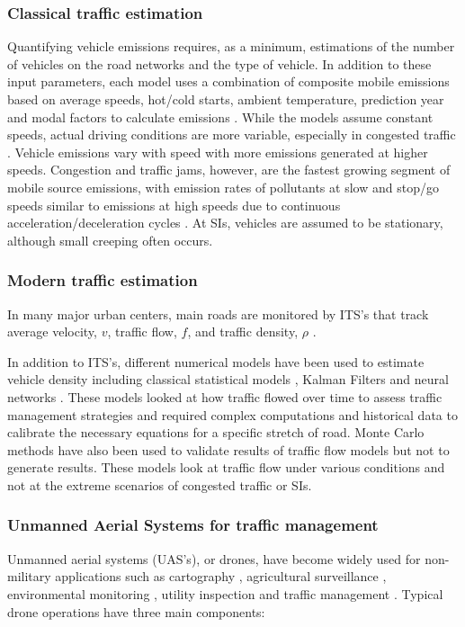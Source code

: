 \subsubsection{Classical traffic estimation} \label{sssec:ClassicalTraffic}

Quantifying vehicle emissions requires, as a minimum, estimations of the number of vehicles on the road networks and the type of vehicle. In addition to these input parameters, each model uses a combination of composite mobile emissions based on average speeds, hot/cold starts, ambient temperature, prediction year and modal factors to calculate emissions \citep{Franco2013}. While the models assume constant speeds, actual driving conditions are more variable, especially in congested traffic \citep{Freeman2015b}. Vehicle emissions vary with speed with more emissions generated at higher speeds. Congestion and traffic jams, however, are the fastest growing segment of mobile source emissions, with emission rates of pollutants at slow and stop/go speeds similar to emissions at high speeds due to continuous acceleration/deceleration cycles \citep{Barth2009}. At SIs, vehicles are assumed to be stationary, although small creeping often occurs.

\subsubsection{Modern traffic estimation}

In many major urban centers, main roads are monitored by ITS's that track average velocity, $v$, traffic flow, $f$, and traffic density, $\rho$ \citep{Wu2007, Abtahi2011, Bartosz2015}.

In addition to ITS's, different numerical models have been used to estimate vehicle density including classical statistical models \citep{Schreckenberg1995}, Kalman Filters \citep{Pourmoallem1997, Sun2004} and neural networks \citep{Ghosh-Dastidar2006}.  These models looked at how traffic flowed over time to assess traffic management strategies and required complex computations and historical data to calibrate the necessary equations for a specific stretch of road.  Monte Carlo methods have also been used to validate results of traffic flow models \citep{Mihaylova2004} but not to generate results.  These models look at traffic flow under various conditions and not at the extreme scenarios of congested traffic or SIs. 

\subsubsection{Unmanned Aerial Systems for traffic management} 
Unmanned aerial systems (UAS's), or drones, have become widely used for non-military applications such as cartography \citep{Saadatseresht2015}, agricultural surveillance \citep{Saari2017}, environmental monitoring \citep{Capolupo2015, Rees2018}, utility inspection \citep{Day2017, Gomez2017} and traffic management \citep{Ke2018, Ahmadi2017,  Salvo2017, Liu2013}.  Typical drone operations have three main components:

